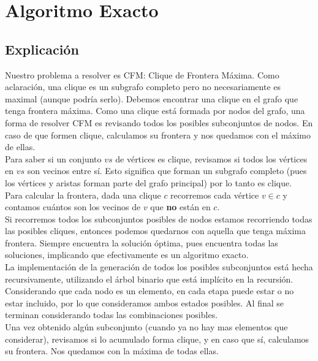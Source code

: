 
\section{Algoritmo Exacto}

\subsection{Explicación}

Nuestro problema a resolver es CFM: Clique de Frontera Máxima. Como aclaración, una clique es un subgrafo completo pero no necesariamente es maximal (aunque podría serlo). Debemos encontrar una clique en el grafo que tenga frontera máxima. Como una clique está formada por nodos del grafo, una forma de resolver CFM es revisando todos los posibles subconjuntos de nodos. En caso de que formen clique, calculamos su frontera y nos quedamos con el máximo de ellas.  \\

Para saber si un conjunto $vs$ de vértices es clique, revisamos si todos los vértices en $vs$ son vecinos entre sí. Esto significa que forman un subgrafo completo (pues los vértices y aristas forman parte del grafo principal) por lo tanto es clique. \\

Para calcular la frontera, dada una clique $c$ recorremos cada vértice $v \in c$ y contamos cuántos son los vecinos de $v$ que \textbf{no} están en $c$. \\

Si recorremos todos los subconjuntos posibles de nodos estamos recorriendo todas las posibles cliques, entonces podemos quedarnos con aquella que tenga máxima frontera. Siempre encuentra la solución óptima, pues encuentra todas las soluciones, implicando que efectivamente es un algoritmo exacto. \\

La implementación de la generación de todos los posibles subconjuntos está hecha recursivamente, utilizando el árbol binario que está implícito en la recursión. Considerando que cada nodo es un elemento, en cada etapa puede estar o no estar incluido, por lo que consideramos ambos estados posibles. Al final se terminan considerando todas las combinaciones posibles. \\

Una vez obtenido algún subconjunto (cuando ya no hay mas elementos que considerar), revisamos si lo acumulado forma clique, y en caso que sí, calculamos su frontera. Nos quedamos con la máxima de todas ellas. \\

